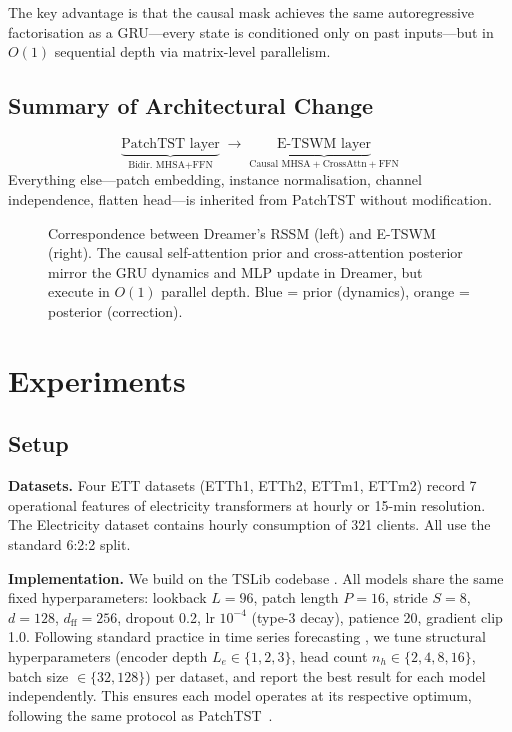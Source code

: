 \documentclass[conference]{IEEEtran}
\begin{document}
The key advantage is that the causal mask achieves the same autoregressive factorisation as a GRU---every state is conditioned only on past inputs---but in $O(1)$ sequential depth via matrix-level parallelism.

\subsection{Summary of Architectural Change}

\begin{equation}
\underbrace{\text{PatchTST layer}}_{\text{Bidir.\ MHSA} + \text{FFN}}
\;\longrightarrow\;
\underbrace{\text{E-TSWM layer}}_{\text{Causal MHSA} + \text{CrossAttn} + \text{FFN}}
\end{equation}
Everything else---patch embedding, instance normalisation, channel independence, flatten head---is inherited from PatchTST without modification.

\begin{figure}[t]
\centering
\resizebox{0.85\columnwidth}{!}{}
\vspace{-2mm}
\caption{Correspondence between Dreamer's RSSM (left) and E-TSWM (right). The causal self-attention prior and cross-attention posterior mirror the GRU dynamics and MLP update in Dreamer, but execute in $O(1)$ parallel depth. Blue = prior (dynamics), orange = posterior (correction).}
\label{fig:arch}
\vspace{-3mm}
\end{figure}

\section{Experiments}

\subsection{Setup}

\textbf{Datasets.} Four ETT datasets (ETTh1, ETTh2, ETTm1, ETTm2) \cite{b_informer} record 7 operational features of electricity transformers at hourly or 15-min resolution. The Electricity dataset \cite{b_electricity} contains hourly consumption of 321 clients. All use the standard 6:2:2 split.

\textbf{Implementation.} We build on the TSLib codebase \cite{b_tslib}. All models share the same fixed hyperparameters: lookback $L{=}96$, patch length $P{=}16$, stride $S{=}8$, $d{=}128$, $d_\text{ff}{=}256$, dropout 0.2, lr $10^{-4}$ (type-3 decay), patience 20, gradient clip 1.0. Following standard practice in time series forecasting \cite{b_patchtst}, we tune structural hyperparameters (encoder depth $L_e \in \{1,2,3\}$, head count $n_h \in \{2,4,8,16\}$, batch size $\in \{32,128\}$) per dataset, and report the best result for each model independently. This ensures each model operates at its respective optimum, following the same protocol as PatchTST~\cite{b_patchtst}.
\end{document}
